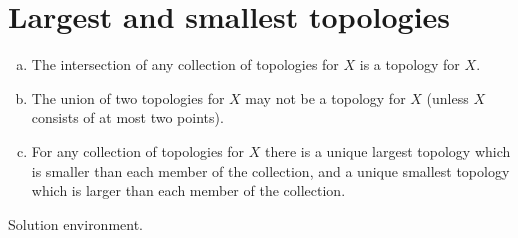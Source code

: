 \section{Largest and smallest topologies}
\label{exercises:1-A}

\begin{exercise}
  \begin{enumerate}[(a)]
    \item
      The intersection of any collection of topologies for \(X\) is a topology
      for \(X\).
    \item
      The union of two topologies for \(X\) may not be a topology for \(X\)
      (unless \(X\) consists of at most two points).
    \item
      For any collection of topologies for \(X\) there is a unique largest
      topology which is smaller than each member of the collection, and a unique
      smallest topology which is larger than each member of the collection.
  \end{enumerate}
\end{exercise}

\begin{solution}
  Solution environment.
\end{solution}
